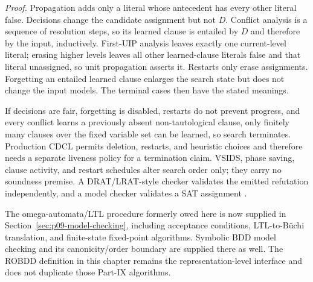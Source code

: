 \noindent\emph{Proof.}
Propagation adds only a literal whose antecedent has every other literal false.
Decisions change the candidate assignment but not \(D\). Conflict analysis is
a sequence of resolution steps, so its learned clause is entailed by \(D\) and
therefore by the input, inductively. First-UIP analysis leaves exactly one
current-level literal; erasing higher levels leaves all other learned-clause
literals false and that literal unassigned, so unit propagation asserts it.
Restarts only erase assignments. Forgetting an entailed learned clause enlarges
the search state but does not change the input models. The terminal cases then
have the stated meanings.

If decisions are fair, forgetting is disabled, restarts do not prevent
progress, and every conflict learns a previously absent non-tautological
clause, only finitely many clauses over the fixed variable set can be learned,
so search terminates. Production CDCL permits deletion, restarts, and heuristic
choices and therefore needs a separate liveness policy for a termination
claim. VSIDS, phase saving, clause activity, and restart schedules alter search
order only; they carry no soundness premise. A DRAT/LRAT-style checker validates
the emitted refutation independently, and a model checker validates a SAT
assignment \cite{WetzlerHeuleHunt2014}.

The omega-automata/LTL procedure formerly owed here is now supplied in
Section~\ref{sec:p09-model-checking}, including acceptance conditions,
LTL-to-B\"uchi translation, and finite-state fixed-point algorithms. Symbolic
BDD model checking and its canonicity/order boundary are supplied there as
well. The ROBDD definition in this chapter remains the representation-level
interface and does not duplicate those Part-IX algorithms.
